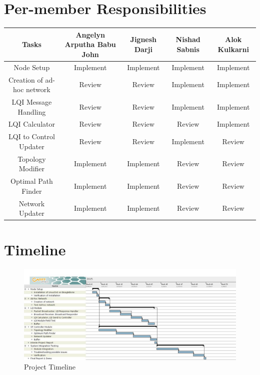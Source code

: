 \documentclass{article}
\begin{document}
\section{Per-member Responsibilities}
\begin{tabular}{  | c | c | c | c | c |}
\hline
Tasks	&	Angelyn Arputha Babu John	&	Jignesh Darji	&	Nishad Sabnis	&	Alok Kulkarni \\
\hline \hline
Node Setup	&	Implement	&	Implement	&	Implement	&	Implement \\
Creation of ad-hoc network	&	Review	&	Review	&	Implement	&	Implement \\
LQI Message Handling	&	Review	&	Review	&	Implement	&	Implement \\ 
LQI Calculator	&	Review	&	Review	&	Review	&	Implement\\ 
LQI to Control Updater	&	Review	&	Review	&	Implement	&	Review \\
Topology Modifier	&	Implement	&	Implement	&	Review	&	Review\\
Optimal Path Finder	&	Implement	&	Implement	&	Review	&	Review\\
Network Updater	&	Implement	&	Implement	&	Review	&	Review\\
\hline
\end{tabular}

\section{Timeline}
\begin{figure}[H]
\caption{Project Timeline}
\centering
\includegraphics[width=\textwidth]{timeline}
\end{figure}
\end{document}
